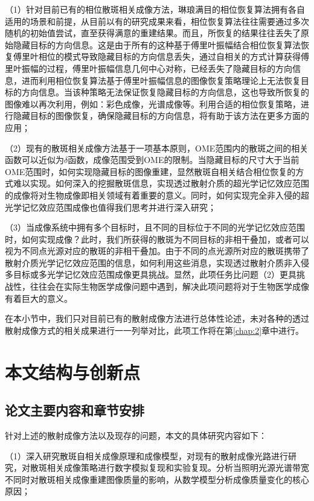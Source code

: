 （1）针对目前已有的相位散斑相关成像方法，琳琅满目的相位恢复算法拥有各自适用的场景和前提，从目前以有的研究成果来看，相位恢复算法往往需要通过多次随机的初始值尝试，直至获得满意的重建结果。而且，所恢复的结果往往丢失了原始隐藏目标的方向信息。这是由于所有的这种基于傅里叶振幅结合相位恢复算法恢复傅里叶相位的模式导致隐藏目标的方向信息丢失，通过自相关的方式计算获得傅里叶振幅的过程，傅里叶振幅信息几何中心对称，已经丢失了隐藏目标的方向信息，进而利用相位恢复算法基于傅里叶振幅信息的图像恢复策略理论上无法恢复目标的方向信息。当该种策略无法保证恢复隐藏目标的方向信息，这也导致所恢复的图像难以再次利用，例如：彩色成像，光谱成像等。利用合适的相位恢复策略，进行隐藏目标的图像恢复，确保隐藏目标的方向信息，将有助于该方法在更多方面的应用；

（2）现有的散斑相关成像方法基于一项基本原则，OME范围内的散斑之间的相关函数可以近似为$\delta$函数，成像范围受到OME的限制。当隐藏目标的尺寸大于当前OME范围时，如何实现隐藏目标的图像重建，显然散斑自相关结合相位恢复的方式难以实现。如何深入的挖掘散斑信息，实现透过散射介质的超光学记忆效应范围的成像将对生物成像即相关领域有着重要的意义。同时，如何实现完全非入侵的超光学记忆效应范围成像也值得我们思考并进行深入研究；

（3）当成像系统中拥有多个目标时，且不同的目标位于不同的光学记忆效应范围时，如何实现成像？此时，我们所获得的散斑为不同目标的非相干叠加，或者可以视为不同点光源对应的散斑的非相干叠加。由于不同的点光源所对应的散斑携带了散射介质光学记忆效应范围的信息，如何利用这些消息，实现透过散射介质非入侵多目标或多光学记忆效应范围成像更具挑战。显然，此项任务比问题（2）更具挑战性，往往会在实际生物医学成像问题中遇到，解决此项问题将对于生物医学成像有着巨大的意义。

在本小节中，我们只对目前已有的散射成像方法进行总体性论述，未对各种的透过散射成像方式的相关成果进行一一列举对比，此项工作将在第\ref{chap:2}章中进行。

\section{本文结构与创新点}

\subsection{论文主要内容和章节安排}
针对上述的散射成像方法以及现存的问题，本文的具体研究内容如下：

（1）深入研究散斑自相关成像原理和成像模型，对现有的散射成像光路进行研究，对散斑相关成像策略进行数字模拟复现和实验复现。分析当照明光源光谱带宽不同时对散斑相关成像重建图像质量的影响，从数学模型分析成像质量变化的核心原因；

